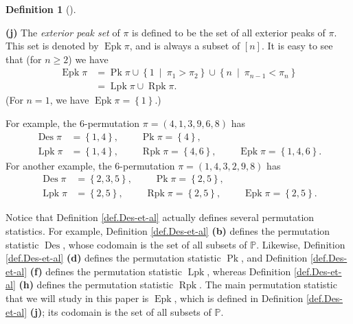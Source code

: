 \documentclass[numbers=enddot,12pt,final,onecolumn,notitlepage]{scrartcl}%
\theoremstyle{definition}
\newtheorem{defi}[theo]{Definition}
\newenvironment{definition}[1][]
{\begin{defi}[#1]\begin{leftbar}}
{\end{leftbar}\end{defi}}
\begin{document}
\begin{definition}
\textbf{(j)} The \textit{exterior peak set} of $\pi$ is defined to be the set
of all exterior peaks of $\pi$. This set is denoted by $\operatorname*{Epk}%
\pi$, and is always a subset of $\left[  n\right]  $. It is easy to see that
(for $n\geq2$) we have%
\begin{align*}
\operatorname*{Epk}\pi &  =\operatorname*{Pk}\pi\cup\left\{  1\ \mid\ \pi
_{1}>\pi_{2}\right\}  \cup\left\{  n\ \mid\ \pi_{n-1}<\pi_{n}\right\} \\
&  =\operatorname*{Lpk}\pi\cup\operatorname*{Rpk}\pi.
\end{align*}
(For $n=1$, we have $\operatorname*{Epk}\pi=\left\{  1\right\}  $.)
\end{definition}

For example, the $6$-permutation $\pi=\left(  4,1,3,9,6,8\right)  $ has%
\begin{align*}
\operatorname*{Des}\pi &  =\left\{  1,4\right\}
,\ \ \ \ \ \ \ \ \ \ \operatorname*{Pk}\pi=\left\{  4\right\}  ,\\
\operatorname*{Lpk}\pi &  =\left\{  1,4\right\}
,\ \ \ \ \ \ \ \ \ \ \operatorname*{Rpk}\pi=\left\{  4,6\right\}
,\ \ \ \ \ \ \ \ \ \ \operatorname*{Epk}\pi=\left\{  1,4,6\right\}  .
\end{align*}
For another example, the $6$-permutation $\pi=\left(  1,4,3,2,9,8\right)  $
has%
\begin{align*}
\operatorname*{Des}\pi &  =\left\{  2,3,5\right\}
,\ \ \ \ \ \ \ \ \ \ \operatorname*{Pk}\pi=\left\{  2,5\right\}  ,\\
\operatorname*{Lpk}\pi &  =\left\{  2,5\right\}
,\ \ \ \ \ \ \ \ \ \ \operatorname*{Rpk}\pi=\left\{  2,5\right\}
,\ \ \ \ \ \ \ \ \ \ \operatorname*{Epk}\pi=\left\{  2,5\right\}  .
\end{align*}


Notice that Definition \ref{def.Des-et-al} actually defines several
permutation statistics. For example, Definition \ref{def.Des-et-al}
\textbf{(b)} defines the permutation statistic $\operatorname*{Des}$, whose
codomain is the set of all subsets of $\mathbb{P}$. Likewise, Definition
\ref{def.Des-et-al} \textbf{(d)} defines the permutation statistic
$\operatorname*{Pk}$, and Definition \ref{def.Des-et-al} \textbf{(f)} defines
the permutation statistic $\operatorname*{Lpk}$, whereas Definition
\ref{def.Des-et-al} \textbf{(h)} defines the permutation statistic
$\operatorname*{Rpk}$. The main permutation statistic that we will study in
this paper is $\operatorname*{Epk}$, which is defined in Definition
\ref{def.Des-et-al} \textbf{(j)}; its codomain is the set of all subsets of
$\mathbb{P}$.
\end{document}
